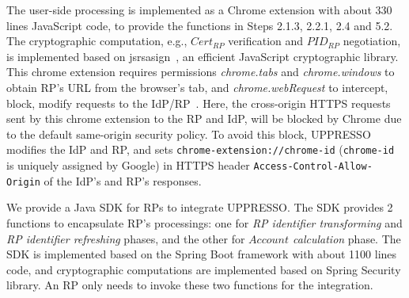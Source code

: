 The user-side processing is implemented as a Chrome extension with about 330 lines JavaScript code, to provide the functions in Steps 2.1.3, 2.2.1, 2.4 and 5.2.
The cryptographic computation, e.g., $Cert_{RP}$ verification and $PID_{RP}$ negotiation, is implemented based on jsrsasign~\cite{jsrsasign}, an efficient JavaScript cryptographic library.
This chrome extension requires permissions  \emph{chrome.tabs} and \emph{chrome.windows} to obtain RP's URL from the browser's tab,  and \emph{chrome.webRequest} to intercept, block, modify requests to the IdP/RP~\cite{chromeExtension}.
Here, the cross-origin HTTPS requests sent by this chrome extension to the RP and IdP, will be blocked by Chrome due to the default same-origin security policy.
To avoid this block, UPPRESSO modifies the IdP and RP, and sets \verb+chrome-extension://chrome-id+ (\verb+chrome-id+ is uniquely assigned by Google) in HTTPS header \verb+Access-Control-Allow-Origin+ of the IdP's and RP's responses.

We provide a Java SDK for RPs to integrate UPPRESSO.
The SDK provides 2 functions to encapsulate RP's processings: one for  \emph{RP identifier transforming} and \emph{RP identifier refreshing} phases, and the other for \emph{$Account$ calculation} phase. %
The SDK is implemented based on the Spring Boot framework  with about 1100 lines code, and cryptographic computations are implemented based on Spring Security library.
An RP only needs to invoke these two functions for the integration.



